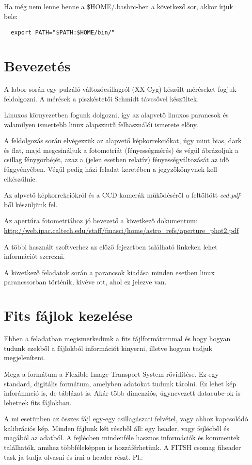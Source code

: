 \documentclass{article}
\begin{document}
Ha még nem lenne benne a \$HOME/.bashrc-ben a következő sor, akkor írjuk bele:
\begin{verbatim}
  export PATH="$PATH:$HOME/bin/"
\end{verbatim}

\section{Bevezetés}

A labor során egy pulzáló változócsillagról (XX Cyg) készült méréseket fogjuk
feldolgozni. A mérések a piszkéstetői Schmidt távcsővel készültek.

Linuxos környezetben fogunk dolgozni, így az alapvető linuxos parancsok és
valamilyen ismertebb linux alapszintű felhasználói ismerete előny.

A feldolgozás során elvégezzük az alapvető képkorrekciókat, úgy mint bias, dark
és flat, majd megcsináljuk a fotometriát (fényességmérés) és végül ábrázoljuk a
csillag fénygörbéjét, azaz a (jelen esetben relatív) fényességváltozását az idő
függvényében.
Végül pedig házi feladat keretében a jegyzőkönyvnek kell elkészülnie.

Az alpvető képkorrekciókról és a CCD kamerák működéséről a feltöltött
{\it ccd.pdf}-ből készüljünk fel.

Az apertúra fotometriához jó bevezető a következő dokumentum:
\url{http://web.ipac.caltech.edu/staff/fmasci/home/astro_refs/aperture_phot2.pdf}

A többi használt szoftverhez az előző fejezetben található linkeken lehet
információt szerezni.

A következő feladatok során a parancsok kiadása minden esetben linux
parancssorban történik, kivéve ott, ahol ez jelezve van.

\section{Fits fájlok kezelése}

Ebben a feladatban megismerkedünk a fits fájlformátummal és hogy hogyan tudunk
ezekből a fájlokból információt kinyerni, illetve hogyan tudjuk megjeleníteni.

Mega a formátum a Flexible Image Transport System rövidítése. Ez egy standard,
digitális formátum, amelyben adatokat tudunk tárolni. Ez lehet kép inforánmció
is, de táblázat is. Akár több dimenziós, úgynevezett datacube-ok is lehetnek
fits fájlokban.

A mi esetünben az összes fájl egy-egy csillagászati felvétel, vagy ahhoz
kapcsolódó kalibrációs kép.
Minden fájlunk két részből áll: egy header, vagy fejlécből és magából az
adatból. A fejlécben mindenféle hasznos információk és kommentek találhatók,
amihez többféleképpen is hozzáférhetünk.
A FITSH csomag fiheader task-ja tudja olvasni és írni a header részt.
Pl.:
\end{document}
